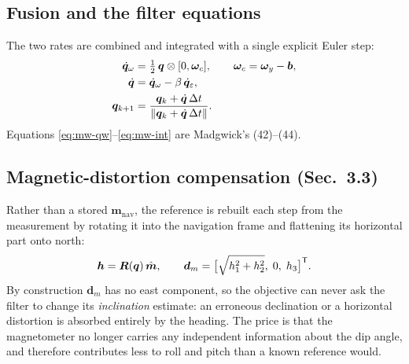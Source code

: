 \subsection{Fusion and the filter equations}
The two rates are combined and integrated with a single explicit Euler step:
\begin{align}
\dot{\bm{q}}_\omega &= \tfrac12\,\bm{q}\otimes[0,\bm{\omega}_c],\qquad \bm{\omega}_c=\bm{\omega}_y-\bm{b},\label{eq:mw-qw}\\
\dot{\bm{q}} &= \dot{\bm{q}}_\omega - \beta\,\dot{\bm{q}}_\varepsilon,\label{eq:mw-qdot}\\
\bm{q}_{k+1} &= \frac{\bm{q}_k+\dot{\bm{q}}\,\Delta t}{\left\lVert \bm{q}_k+\dot{\bm{q}}\,\Delta t \right\rVert} .\label{eq:mw-int}
\end{align}
Equations \eqref{eq:mw-qw}--\eqref{eq:mw-int} are Madgwick's (42)--(44).

\subsection{Magnetic-distortion compensation (Sec.~3.3)}
Rather than a stored $\bm{m}_{\text{nav}}$, the reference is rebuilt each step from the measurement
by rotating it into the navigation frame and flattening its horizontal part onto north:
\begin{equation}
\bm{h} = \bm{R}(\bm{q})\,\hat{\bm{m}},\qquad
\bm{d}_m = \big[\sqrt{h_1^2+h_2^2},\;0,\;h_3\big]^{\mathsf{T}} .
\label{eq:mw-flux}
\end{equation}
By construction $\bm{d}_m$ has no east component, so the objective can never ask the filter to
change its \emph{inclination} estimate: an erroneous declination or a horizontal distortion is
absorbed entirely by the heading. The price is that the magnetometer no longer carries any
independent information about the dip angle, and therefore contributes less to roll and pitch than
a known reference would.

